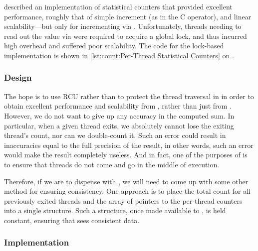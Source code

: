 described an implementation of statistical counters that provided
excellent
performance, roughly that of simple increment (as in the C \co{++}
operator), and linear scalability---but only for incrementing
via .
Unfortunately, threads needing to read out the value via 
were required to acquire a global
lock, and thus incurred high overhead and suffered poor scalability.
The code for the lock-based implementation is shown in
\cref{lst:count:Per-Thread Statistical Counters} on
.

\QuickQuizEnd

\subsubsection{Design}

The hope is to use RCU rather than  to protect the
thread traversal in  in order to obtain excellent
performance and scalability from , rather than just
from .
However, we do not want to give up any accuracy in the computed sum.
In particular, when a given thread exits, we absolutely cannot
lose the exiting thread's count, nor can we double-count it.
Such an error could result in inaccuracies equal to the full
precision of the result, in other words, such an error would
make the result completely useless.
And in fact, one of the purposes of  is to
ensure that threads do not come and go in the middle of 
execution.

Therefore, if we are to dispense with , we will need
to come up with some other method for ensuring consistency.
One approach is to place the total count for all previously exited
threads and the array of pointers to the per-thread counters into a single
structure.
Such a structure, once made available to , is
held constant, ensuring that  sees consistent data.

\subsubsection{Implementation}

